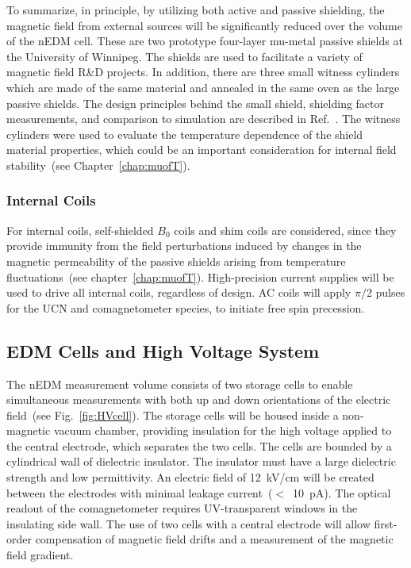 To summarize, in principle, by utilizing both active and passive
shielding, the magnetic field from external sources will be
significantly reduced over the volume of the nEDM cell. These are two
prototype four-layer mu-metal passive shields at the University of
Winnipeg. The shields are used to facilitate a variety of magnetic
field R\&D projects. In addition, there are three small witness
cylinders which are made of the same material and annealed in the same
oven as the large passive shields. The design principles behind the
small shield, shielding factor measurements, and comparison to
simulation are described in Ref.~\cite{martin2015large}.  The witness
cylinders were used to evaluate the temperature dependence of the
shield material properties, which could be an important consideration
for internal field stability~(see Chapter~\ref{chap:muofT}).




\subsubsection{Internal Coils}
For internal coils, self-shielded $B_0$ coils and shim coils are
considered, since they provide immunity
from the field perturbations induced by changes in the magnetic
permeability of the passive shields arising from temperature
fluctuations~(see chapter~\ref{chap:muofT}).  High-precision current
supplies
will be used to drive all internal coils, regardless of design. AC
coils will apply $\pi/2$ pulses for the UCN and comagnetometer
species, to initiate free spin precession.





\subsection{ EDM Cells and High Voltage System\label{sec:edmcell}}
The nEDM measurement volume consists of two storage cells to enable
simultaneous measurements with both up and down orientations of the
electric field~(see Fig.~\ref{fig:HVcell}). The storage cells will be
housed inside a non-magnetic vacuum chamber, providing insulation for
the high voltage applied to the central electrode, which separates the
two cells. The cells are bounded by a cylindrical wall of dielectric
insulator. The insulator must have a large dielectric strength and low
permittivity. An electric field of 12~kV/cm will be created between
the electrodes with minimal leakage current~($<$~10~pA). The optical
readout of the comagnetometer requires UV-transparent windows in the
insulating side wall. The use of two cells with a central electrode
will allow first-order compensation of magnetic field drifts and a
measurement of the magnetic field gradient.

